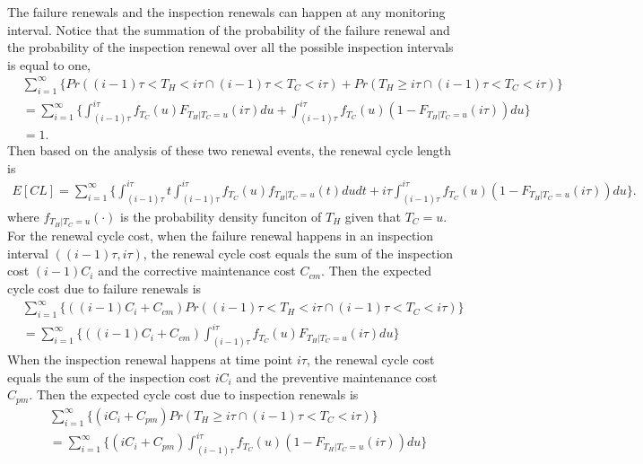 \documentclass[10pt,a4paper]{article}
\theoremstyle{remark}
\begin{document}
The failure renewals and the inspection renewals can happen at any monitoring interval. Notice that the summation of the probability of the failure renewal and the probability of the inspection renewal over all the possible inspection intervals is equal to one,
\begin{align*}
& \sum_{i=1}^{\infty} \Bigg\{Pr((i-1)\tau<T_{H}<i\tau \cap (i-1)\tau<T_{C}<i\tau )+Pr(T_{H}\geq i\tau \cap (i-1)\tau<T_{C}<i\tau ) \Bigg\} \nonumber \\
& = \sum_{i=1}^{\infty} \Bigg\{ \int_{(i-1)\tau}^{i\tau} f_{T_{C}}(u) F_{T_{H}|T_{C}=u}(i\tau)du+\int_{(i-1)\tau}^{i\tau} f_{T_{C}}(u) (1-F_{T_{H}|T_{C}=u}(i\tau))du \Bigg\} \nonumber \\
& = 1. 
\end{align*}
Then based on the analysis of these two renewal events, the renewal cycle length is
\begin{align} \label{eq:model3cyclelength}
E[CL]= \sum_{i=1}^{\infty} \Bigg\{ \int_{(i-1)\tau}^{i\tau} t \int_{(i-1)\tau}^{i\tau} f_{T_{C}}(u) f_{T_{H}|T_{C}=u}(t)du dt + i\tau \int_{(i-1)\tau}^{i\tau} f_{T_{C}}(u) (1-F_{T_{H}|T_{C}=u}(i\tau)) du \Bigg\}.  
\end{align}
where $f_{T_{H}|T_{C}=u}(\cdot)$ is the probability density funciton of $T_{H}$ given that $T_{C}=u$.
For the renewal cycle cost, when the failure renewal happens in an inspection interval $((i-1)\tau,i\tau)$, the renewal cycle cost equals the sum of the inspection cost $(i-1)C_{i}$ and the corrective maintenance cost $C_{cm}$. Then the expected cycle cost due to failure renewals is
\begin{align} \label{eq:model3cyclecost1}
& \sum_{i=1}^{\infty} \Bigg\{((i-1)C_{i}+C_{cm})Pr((i-1)\tau<T_{H}<i\tau \cap (i-1)\tau<T_{C}<i\tau ) \Bigg\} \nonumber \\
& = \sum_{i=1}^{\infty} \Bigg\{ ((i-1)C_{i}+C_{cm})\int_{(i-1)\tau}^{i\tau} f_{T_{C}}(u) F_{T_{H}|T_{C}=u}(i\tau)du \Bigg\}  
\end{align} 
When the inspection renewal happens at time point $i\tau$, the renewal cycle cost equals the sum of the inspection cost $iC_{i}$ and the preventive maintenance cost $C_{pm}$. Then the expected cycle cost due to inspection renewals is
\begin{align} \label{eq:model3cyclecost2}
& \sum_{i=1}^{\infty} \Bigg\{(iC_{i}+C_{pm})Pr(T_{H}\geq i\tau \cap (i-1)\tau<T_{C}<i\tau ) \Bigg\} \nonumber \\
& = \sum_{i=1}^{\infty} \Bigg\{ (iC_{i}+C_{pm})\int_{(i-1)\tau}^{i\tau} f_{T_{C}}(u) (1-F_{T_{H}|T_{C}=u}(i\tau))du \Bigg\}  
\end{align}
\end{document}
